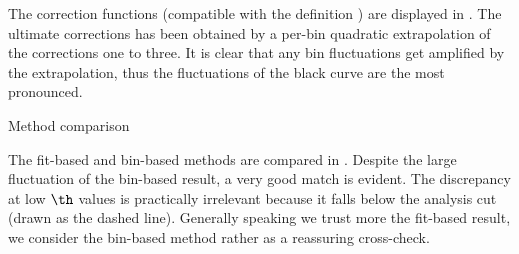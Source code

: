 The correction functions (compatible with the definition ) are displayed in . The ultimate corrections has been obtained by a per-bin quadratic extrapolation of the corrections one to three. It is clear that any bin fluctuations get amplified by the extrapolation, thus the fluctuations of the black curve are the most pronounced.

\bmfig
{}
\emfig

\caption{Method comparison}

The fit-based and bin-based methods are compared in . Despite the large fluctuation of the bin-based result, a very good match is evident. The discrepancy at low $\th$ values is practically irrelevant because it falls below the analysis cut (drawn as the dashed line). Generally speaking we trust more the fit-based result, we consider the bin-based method rather as a reassuring cross-check.

